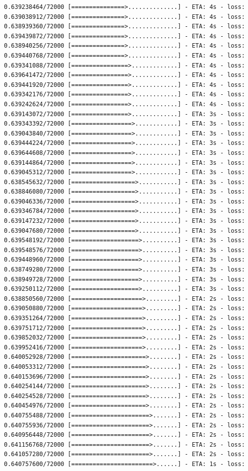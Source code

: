 \documentclass[12pt,fleqn]{article}\usepackage{../../common}
\begin{document}
\begin{verbatim}
0.639238464/72000 [===============>..............] - ETA: 4s - loss: 0.639038912/72000 [===============>..............] - ETA: 4s - loss: 0.638939360/72000 [===============>..............] - ETA: 4s - loss: 0.639439872/72000 [===============>..............] - ETA: 4s - loss: 0.638940256/72000 [===============>..............] - ETA: 4s - loss: 0.639440768/72000 [===============>..............] - ETA: 4s - loss: 0.639341088/72000 [================>.............] - ETA: 4s - loss: 0.639641472/72000 [================>.............] - ETA: 4s - loss: 0.639441920/72000 [================>.............] - ETA: 4s - loss: 0.639342176/72000 [================>.............] - ETA: 4s - loss: 0.639242624/72000 [================>.............] - ETA: 4s - loss: 0.639143072/72000 [================>.............] - ETA: 3s - loss: 0.639343392/72000 [=================>............] - ETA: 3s - loss: 0.639043840/72000 [=================>............] - ETA: 3s - loss: 0.639444224/72000 [=================>............] - ETA: 3s - loss: 0.639644608/72000 [=================>............] - ETA: 3s - loss: 0.639144864/72000 [=================>............] - ETA: 3s - loss: 0.639045312/72000 [=================>............] - ETA: 3s - loss: 0.638545632/72000 [==================>...........] - ETA: 3s - loss: 0.638846080/72000 [==================>...........] - ETA: 3s - loss: 0.639046336/72000 [==================>...........] - ETA: 3s - loss: 0.639346784/72000 [==================>...........] - ETA: 3s - loss: 0.639147232/72000 [==================>...........] - ETA: 3s - loss: 0.639047680/72000 [==================>...........] - ETA: 3s - loss: 0.639548192/72000 [===================>..........] - ETA: 3s - loss: 0.639548576/72000 [===================>..........] - ETA: 3s - loss: 0.639448960/72000 [===================>..........] - ETA: 3s - loss: 0.638749280/72000 [===================>..........] - ETA: 3s - loss: 0.638949728/72000 [===================>..........] - ETA: 3s - loss: 0.639250112/72000 [===================>..........] - ETA: 3s - loss: 0.638850560/72000 [====================>.........] - ETA: 2s - loss: 0.639050880/72000 [====================>.........] - ETA: 2s - loss: 0.639351264/72000 [====================>.........] - ETA: 2s - loss: 0.639751712/72000 [====================>.........] - ETA: 2s - loss: 0.639852032/72000 [====================>.........] - ETA: 2s - loss: 0.639952416/72000 [====================>.........] - ETA: 2s - loss: 0.640052928/72000 [=====================>........] - ETA: 2s - loss: 0.640053312/72000 [=====================>........] - ETA: 2s - loss: 0.640153696/72000 [=====================>........] - ETA: 2s - loss: 0.640254144/72000 [=====================>........] - ETA: 2s - loss: 0.640254528/72000 [=====================>........] - ETA: 2s - loss: 0.640454976/72000 [=====================>........] - ETA: 2s - loss: 0.640755488/72000 [======================>.......] - ETA: 2s - loss: 0.640755936/72000 [======================>.......] - ETA: 2s - loss: 0.640956448/72000 [======================>.......] - ETA: 2s - loss: 0.641156768/72000 [======================>.......] - ETA: 2s - loss: 0.641057280/72000 [======================>.......] - ETA: 2s - loss: 0.640757600/72000 [=======================>......] - ETA: 1s - loss: 
\end{verbatim}
\end{document}
